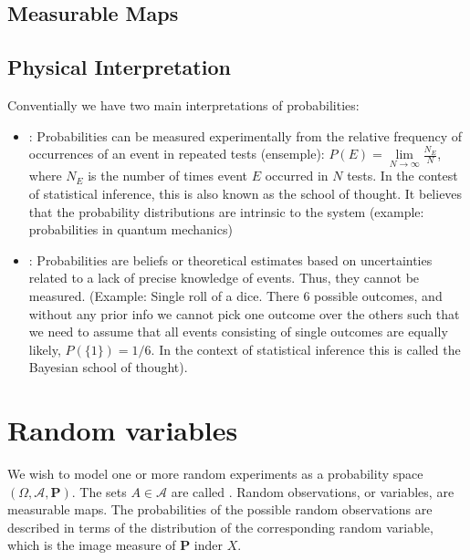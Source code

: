 \documentclass[12pt, a4paper, oneside, openright, titlepage]{book}
\begin{document}
\subsection{Measurable Maps}


\subsection{Physical Interpretation}

Conventially we have two main interpretations of probabilities:

\begin{itemize}
    \item {}: Probabilities can be measured experimentally from the relative frequency of occurrences of an event in repeated tests (ensemple): $P(E) = \lim\limits_{N\rightarrow \infty}\frac{N_E}{N}$, where $N_E$ is the number of times event $E$ occurred in $N$ tests. In the contest of statistical inference, this is also known as the  school of thought. It believes that the probability distributions are intrinsic to the system (example: probabilities in quantum mechanics)
    \item {}: Probabilities are beliefs or theoretical estimates based on uncertainties related to a lack of precise knowledge of events. Thus, they cannot be measured. (Example: Single roll of a dice. There 6 possible outcomes, and without any prior info we cannot pick one outcome over the others such that we need to assume that all events consisting of single outcomes are equally likely, $P(\{1\}) = 1/6$. In the context of statistical inference this is called the Bayesian school of thought).
\end{itemize}

\section{Random variables}

We wish to model one or more random experiments as a probability space $(\Omega,\mathcal{A},\mathbf{P})$. The sets $A \in \mathcal{A}$ are called . Random observations, or variables, are measurable maps. The probabilities of the possible random observations are described in terms of the distribution of the corresponding random variable, which is the image measure of $\mathbf{P}$ inder $X$.
\end{document}
